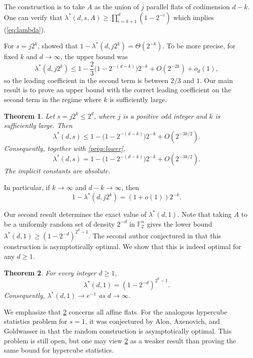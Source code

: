\documentclass[10pt,a4paper]{amsart}
\newtheorem{theorem}{Theorem}[section]
\newcommand{\F}{\mathbb F}
\begin{document}
The construction is to take $A$ as the union of $j$ parallel flats of codimension $d-k$. One can verify that $\lambda^*(d,s,A)\ge \prod_{i = k+1}^d(1-2^{-i})$ which implies (\ref{eq:lambda}).

For $s=j2^k$, \cite{Xu2026}
showed that $1-\lambda^*(d,j2^k)=\Theta(2^{-k})$. To be more precise, for fixed $k$ and $d\to\infty$, the upper bound was
\[
  \lambda^*(d,j2^k)\le 1-\frac23\bigl(1-2^{-(d-k)}\bigr)2^{-k}
  +O(2^{-2k})+o_d(1),
\]
so the leading coefficient in the second term is between
$2/3$ and $1$. Our main result is to prove an upper bound with the correct leading coefficient on the second term in the regime where $k$ is sufficiently large.



\begin{theorem}\label{thm:main}
Let $s=j2^k\le2^d$, where $j$ is a positive odd integer and $k$ is
sufficiently large.
Then
\[\lambda^*(d,s)\le 1-\bigl(1-2^{-(d-k)}\bigr)2^{-k}+O(2^{-3k/2}).\]
Consequently, together with \cref{prop:lower},
\[\lambda^*(d,s) =1-\bigl(1-2^{-(d-k)}\bigr)2^{-k}+O(2^{-3k/2}).\]
The implicit constants are absolute.
\end{theorem}


In particular, if $k\to\infty$ and $d-k\to\infty$, then
\[
  1-\lambda^*(d,j2^k)=(1+o(1))2^{-k}.
\]


Our second result determines the exact value of $\lambda^*(d,1)$. Note that taking $A$ to be a uniformly random set of density $2^{-d}$ in $\F_2^n$ gives the lower
bound $\lambda^*(d,1)\ge (1-2^{-d})^{2^d-1}$. The second author conjectured in \cite{Xu2026} that this construction is asymptotically optimal. We show that this is indeed optimal for any $d\geq 1$.

\begin{theorem}\label{thm:singleton}
For every integer $d\ge1$,
\[
  \lambda^*(d,1)=(1-2^{-d})^{2^d-1}.
\]
Consequently, $\lambda^*(d,1)\to e^{-1}$ as $d\to\infty$.
\end{theorem}
 
We emphasize that \cref{thm:singleton} concerns
all affine flats. For the analogous hypercube statistics problem for $s = 1$, it was conjectured by Alon, Axenovich, and Goldwasser in \cite{AlonAxenovichGoldwasser2024} that the random construction is asymptotically optimal. This problem is still open, but one may view \cref{thm:singleton} as a weaker result than proving the same bound for hypercube statistics.
\end{document}
